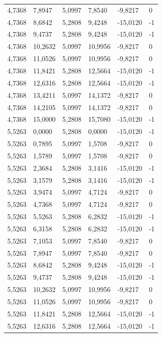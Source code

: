 \documentclass[12pt]{article}
\begin{document}
\begin{longtable}{@{}llllll@{}}
		4,7368  & 7,8947  & 5,0997  & 7,8540  & -9,8217  & 0  \\
		4,7368  & 8,6842  & 5,2808  & 9,4248  & -15,0120 & -1 \\
		4,7368  & 9,4737  & 5,2808  & 9,4248  & -15,0120 & -1 \\
		4,7368  & 10,2632 & 5,0997  & 10,9956 & -9,8217  & 0  \\
		4,7368  & 11,0526 & 5,0997  & 10,9956 & -9,8217  & 0  \\
		4,7368  & 11,8421 & 5,2808  & 12,5664 & -15,0120 & -1 \\
		4,7368  & 12,6316 & 5,2808  & 12,5664 & -15,0120 & -1 \\
		4,7368  & 13,4211 & 5,0997  & 14,1372 & -9,8217  & 0  \\
		4,7368  & 14,2105 & 5,0997  & 14,1372 & -9,8217  & 0  \\
		4,7368  & 15,0000 & 5,2808  & 15,7080 & -15,0120 & -1 \\
		5,5263  & 0,0000  & 5,2808  & 0,0000  & -15,0120 & -1 \\
		5,5263  & 0,7895  & 5,0997  & 1,5708  & -9,8217  & 0  \\
		5,5263  & 1,5789  & 5,0997  & 1,5708  & -9,8217  & 0  \\
		5,5263  & 2,3684  & 5,2808  & 3,1416  & -15,0120 & -1 \\
		5,5263  & 3,1579  & 5,2808  & 3,1416  & -15,0120 & -1 \\
		5,5263  & 3,9474  & 5,0997  & 4,7124  & -9,8217  & 0  \\
		5,5263  & 4,7368  & 5,0997  & 4,7124  & -9,8217  & 0  \\
		5,5263  & 5,5263  & 5,2808  & 6,2832  & -15,0120 & -1 \\
		5,5263  & 6,3158  & 5,2808  & 6,2832  & -15,0120 & -1 \\
		5,5263  & 7,1053  & 5,0997  & 7,8540  & -9,8217  & 0  \\
		5,5263  & 7,8947  & 5,0997  & 7,8540  & -9,8217  & 0  \\
		5,5263  & 8,6842  & 5,2808  & 9,4248  & -15,0120 & -1 \\
		5,5263  & 9,4737  & 5,2808  & 9,4248  & -15,0120 & -1 \\
		5,5263  & 10,2632 & 5,0997  & 10,9956 & -9,8217  & 0  \\
		5,5263  & 11,0526 & 5,0997  & 10,9956 & -9,8217  & 0  \\
		5,5263  & 11,8421 & 5,2808  & 12,5664 & -15,0120 & -1 \\
		5,5263  & 12,6316 & 5,2808  & 12,5664 & -15,0120 & -1 \\

\end{longtable}
\end{document}
